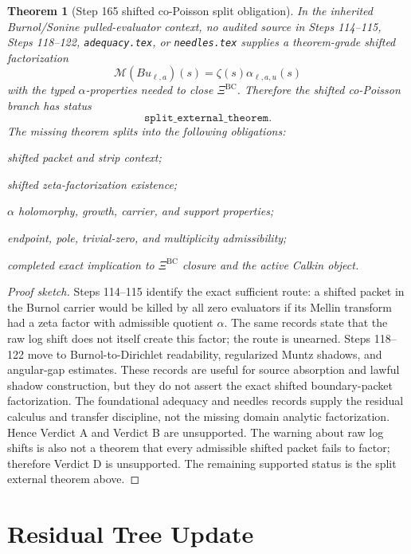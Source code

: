 \documentclass[11pt]{article}
\newtheorem{theorem}{Theorem}
\newcommand{\XiBC}{\Xi^{\mathrm{BC}}}
\newcommand{\Mell}{\mathcal M}
\newcommand{\zetaF}{\zeta}
\begin{document}
\begin{theorem}[Step 165 shifted co-Poisson split obligation]
In the inherited Burnol/Sonine pulled-evaluator context, no audited source in
Steps 114--115, Steps 118--122, \texttt{adequacy.tex}, or \texttt{needles.tex}
supplies a theorem-grade shifted factorization
\[
  \Mell(Bu_{\ell,a})(s)=\zetaF(s)\alpha_{\ell,a,u}(s)
\]
with the typed \(\alpha\)-properties needed to close \(\XiBC\). Therefore the
shifted co-Poisson branch has status
\[
  \boxed{\texttt{split\_external\_theorem}}.
\]
The missing theorem splits into the following obligations:
\begin{description}[leftmargin=2.5em]
\item[H1] shifted packet and strip context;
\item[H2] shifted zeta-factorization existence;
\item[H3] \(\alpha\) holomorphy, growth, carrier, and support properties;
\item[H4] endpoint, pole, trivial-zero, and multiplicity admissibility;
\item[H5] completed exact implication to \(\XiBC\) closure and the active
  Calkin object.
\end{description}
\end{theorem}

\begin{proof}[Proof sketch]
Steps 114--115 identify the exact sufficient route: a shifted packet in the
Burnol carrier would be killed by all zero evaluators if its Mellin transform
had a zeta factor with admissible quotient \(\alpha\). The same records state
that the raw log shift does not itself create this factor; the route is
unearned. Steps 118--122 move to Burnol-to-Dirichlet readability, regularized
Muntz shadows, and angular-gap estimates. These records are useful for source
absorption and lawful shadow construction, but they do not assert the exact
shifted boundary-packet factorization. The foundational adequacy and needles
records supply the residual calculus and transfer discipline, not the missing
domain analytic factorization. Hence Verdict A and Verdict B are unsupported.
The warning about raw log shifts is also not a theorem that every admissible
shifted packet fails to factor; therefore Verdict D is unsupported. The
remaining supported status is the split external theorem above.
\end{proof}

\section*{Residual Tree Update}
\end{document}
